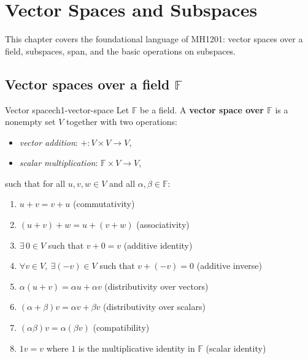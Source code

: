 
\section{Vector Spaces and Subspaces}
\label{sec:vector-spaces-subspaces}


This chapter covers the foundational language of MH1201: vector spaces over a field, subspaces, span, and the basic operations on subspaces.


\subsection{Vector spaces over a field $\mathbb{F}$}


\begin{definition}{Vector space}{ch1-vector-space}
Let $\mathbb{F}$ be a field. A \textbf{vector space over $\mathbb{F}$} is a nonempty set $V$ together with two operations:
\begin{itemize}
\item \emph{vector addition}: $+:V\times V\to V$,
\item \emph{scalar multiplication}: $\mathbb{F}\times V\to V$,
\end{itemize}
such that for all $u,v,w\in V$ and all $\alpha,\beta\in\mathbb{F}$:
\begin{enumerate}
\item $u+v=v+u$ \hfill (commutativity)
\item $(u+v)+w=u+(v+w)$ \hfill (associativity)
\item $\exists\,0\in V$ such that $v+0=v$ \hfill (additive identity)
\item $\forall v\in V,\ \exists(-v)\in V$ such that $v+(-v)=0$ \hfill (additive inverse)
\item $\alpha(u+v)=\alpha u+\alpha v$ \hfill (distributivity over vectors)
\item $(\alpha+\beta)v=\alpha v+\beta v$ \hfill (distributivity over scalars)
\item $(\alpha\beta)v=\alpha(\beta v)$ \hfill (compatibility)
\item $1v=v$ where $1$ is the multiplicative identity in $\mathbb{F}$ \hfill (scalar identity)
\end{enumerate}
\end{definition}

